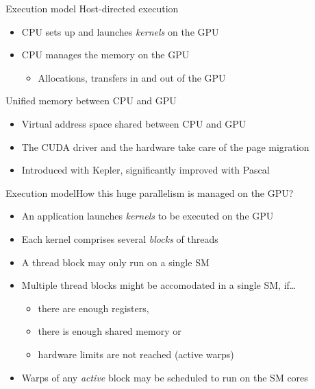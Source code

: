 \documentclass[aspectratio=169,12pt]{beamer}
\begin{document}
\begin{frame}{Execution model}
  Host-directed execution
  \begin{itemize}
  \item CPU sets up and launches \emph{kernels} on the GPU
  \item CPU manages the memory on the GPU
    \begin{itemize}
    \item Allocations, transfers in and out of the GPU
    \end{itemize}
  \end{itemize}
  \pause\vfill
  Unified memory between CPU and GPU
  \begin{itemize}
  \item Virtual address space shared between CPU and GPU
  \item The CUDA driver and the hardware take care of the page migration
  \item Introduced with Kepler, significantly improved with Pascal
  \end{itemize}
\end{frame}


\begin{frame}{Execution model}{How this huge parallelism is managed on the GPU?}
  \begin{itemize}
  \item An application launches \emph{kernels} to be executed on the GPU
  \item Each kernel comprises several \emph{blocks} of threads
  \item A thread block may only run on a single SM
  \item Multiple thread blocks might be accomodated in a single SM, if\dots
    \begin{itemize}
    \item there are enough registers,
    \item there is enough shared memory or
    \item hardware limits are not reached (active warps)
    \end{itemize}
  \item Warps of any \emph{active} block may be scheduled to run on the SM cores
  \end{itemize}
\end{frame}
\end{document}
